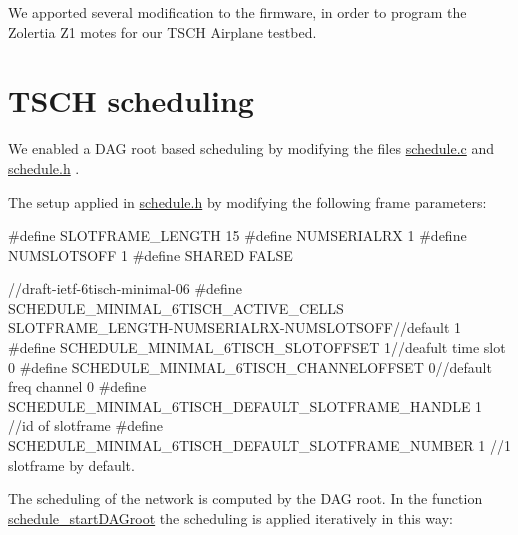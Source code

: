 We apported several modification to the firmware, in order to program the Zolertia Z1 motes for our T\+S\+CH Airplane testbed.



 \hypertarget{_l_k_n_contribution_TSCH_scheduling}{}\section{T\+S\+C\+H scheduling}\label{_l_k_n_contribution_TSCH_scheduling}
We enabled a D\+AG root based scheduling by modifying the files \hyperlink{schedule_8c}{schedule.\+c} and \hyperlink{schedule_8h}{schedule.\+h} .

The setup applied in \hyperlink{schedule_8h}{schedule.\+h} by modifying the following frame parameters\+: 
\begin{DoxyCodeInclude}
\textcolor{preprocessor}{#define SLOTFRAME\_LENGTH    15}
\textcolor{preprocessor}{#define NUMSERIALRX          1 }
\textcolor{preprocessor}{#define NUMSLOTSOFF          1 }
\textcolor{preprocessor}{}
\textcolor{preprocessor}{#define SHARED FALSE}

\textcolor{comment}{//draft-ietf-6tisch-minimal-06 }
\textcolor{comment}{}\textcolor{preprocessor}{#define SCHEDULE\_MINIMAL\_6TISCH\_ACTIVE\_CELLS  SLOTFRAME\_LENGTH-NUMSERIALRX-NUMSLOTSOFF//default 1}
\textcolor{preprocessor}{#define SCHEDULE\_MINIMAL\_6TISCH\_SLOTOFFSET                        1//deafult time slot 0}
\textcolor{preprocessor}{#define SCHEDULE\_MINIMAL\_6TISCH\_CHANNELOFFSET                     0//default freq channel 0}
\textcolor{preprocessor}{#define SCHEDULE\_MINIMAL\_6TISCH\_DEFAULT\_SLOTFRAME\_HANDLE          1 //id of slotframe}
\textcolor{preprocessor}{#define SCHEDULE\_MINIMAL\_6TISCH\_DEFAULT\_SLOTFRAME\_NUMBER          1 //1 slotframe by default.}

\end{DoxyCodeInclude}
 The scheduling of the network is computed by the D\+AG root. In the function \hyperlink{group___schedule_gade694f312044f8bff151d58c7976d067}{schedule\+\_\+start\+D\+A\+Groot} the scheduling is applied iteratively in this way\+:


